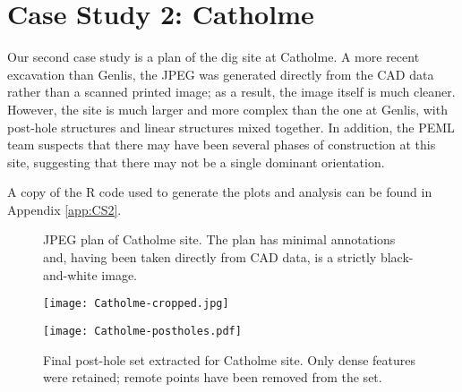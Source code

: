 \documentclass[../../ArchStats.tex]{subfiles}
\begin{document}
\section{Case Study 2: Catholme}
\label{sec:CS2}

Our second case study is a plan of the dig site at Catholme. A more recent excavation than Genlis, the JPEG was generated directly from the CAD data rather than a scanned printed image; as a result, the image itself is much cleaner. However, the site is much larger and more complex than the one at Genlis, with post-hole structures and linear structures mixed together. In addition, the PEML team suspects that there may have been several phases of construction at this site, suggesting that there may not be a single dominant orientation. 

A copy of the R code used to generate the plots and analysis can be found in Appendix \ref{app:CS2}.

 \begin{figure}[h!]
 \begin{minipage}[t]{0.47\textwidth}
 \caption{JPEG plan of Catholme site. The plan has minimal annotations and, having been taken directly from CAD data, is a strictly black-and-white image.}
 \centering
 \texttt{[image: Catholme-cropped.jpg]}
 \end{minipage}
 \hfill
	\begin{minipage}[t]{0.47\textwidth}
	\caption{Final post-hole set extracted for Catholme site. Only dense features were retained; remote points have been removed from the set.}
	\label{fig:Catholme-f-ext-postholes}
	\centering
	\texttt{[image: Catholme-postholes.pdf]}
    \end{minipage}
 \end{figure}
 
\end{document}
